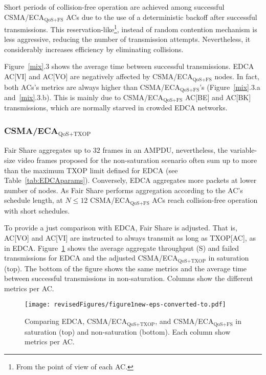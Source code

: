 \documentclass[a4paper]{article}
\begin{document}
Short periods of collision-free operation are achieved among successful CSMA/ECA$_{\text{QoS+FS}}$ ACs due to the use of a deterministic backoff after successful transmissions. This reservation-like\footnote{From the point of view of each AC.}, instead of random contention mechanism is less aggressive, reducing the number of transmission attempts. Nevertheless, it considerably increases efficiency by eliminating collisions. 

Figure~\ref{mix}.3 shows the average time between successful transmissions. EDCA AC[VI] and AC[VO] are negatively affected by CSMA/ECA$_{\text{QoS+FS}}$ nodes. In fact, both ACs's metrics are always higher than CSMA/ECA$_{\text{QoS+FS}}$'s (Figure~\ref{mix}.3.a and~\ref{mix}.3.b). This is mainly due to CSMA/ECA$_{\text{QoS+FS}}$ AC[BE] and AC[BK] transmissions, which are normally starved in crowded EDCA networks.

\subsubsection{CSMA/ECA$_{\text{QoS+TXOP}}$}
Fair Share aggregates up to $32$ frames in an AMPDU, nevertheless, the variable-size video frames proposed for the non-saturation scenario often sum up to more than the maximum TXOP limit defined for EDCA (see Table~\ref{tab:EDCAparams}). Conversely, EDCA aggregates more packets at lower number of nodes. As Fair Share performs aggregation according to the AC's schedule length, at $N\le12$ CSMA/ECA$_\text{QoS+FS}$ ACs reach collision-free operation with short schedules.

To provide a just comparison with EDCA, Fair Share is adjusted. That is, AC[VO] and AC[VI] are instructed to always transmit as long as TXOP[AC], as in EDCA. Figure~\ref{fig:multiplotSatTXOP} shows the average aggregate throughput (S) and failed transmissions for EDCA and the adjusted CSMA/ECA$_\text{QoS+TXOP}$ in saturation (top). The bottom of the figure shows the same metrics and the average time between successful transmissions in non-saturation. Columns show the different metrics per AC.

	\begin{figure}[t]
		\centering
			\texttt{[image: revisedFigures/figure1new-eps-converted-to.pdf]}
			\caption{Comparing EDCA, CSMA/ECA$_{\text{QoS+TXOP}}$, and CSMA/ECA$_{\text{QoS+FS}}$ in saturation (top) and non-saturation (bottom). Each column show metrics per AC.}
			\label{fig:multiplotSatTXOP}
	\end{figure}
\end{document}
